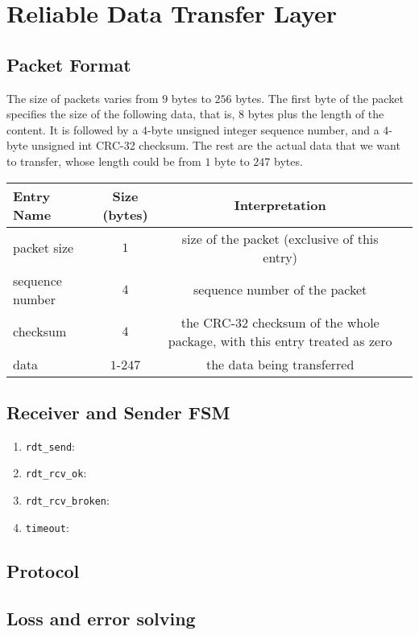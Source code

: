 \documentclass[10pt,a4paper]{article}
\begin{document}
\section{Reliable Data Transfer Layer}
\subsection{Packet Format}
    The size of packets varies from $9$ bytes to $256$ bytes. The first byte of the packet specifies the size of the following data, that is, $8$ bytes plus the length of the content. It is followed by a $4$-byte unsigned integer sequence number, and a $4$-byte unsigned int CRC-32 checksum. The rest are the actual data that we want to transfer, whose length could be from $1$ byte to $247$ bytes.

\begin{center}
    \begin{tabular}{lccc}
        Entry Name & Size (bytes) & Interpretation \\%
            \hline
        packet size & $1$ &  size of the packet (exclusive of this entry)\\ 
        sequence number & $4$ & sequence number of the packet\\
        checksum & $4$ & the CRC-32 checksum of the whole package, with this entry treated as zero\\
        data & $1$-$247$ & the data being transferred\\
    \end{tabular}
\end{center}

    
\subsection{Receiver and Sender FSM}
    \begin{enumerate}
        \item \texttt{rdt\_send}:
        \item \texttt{rdt\_rcv\_ok}:
        \item \texttt{rdt\_rcv\_broken}:
        \item \texttt{timeout}:
    \end{enumerate}
\subsection{Protocol}
\subsection{Loss and error solving}
\end{document}
